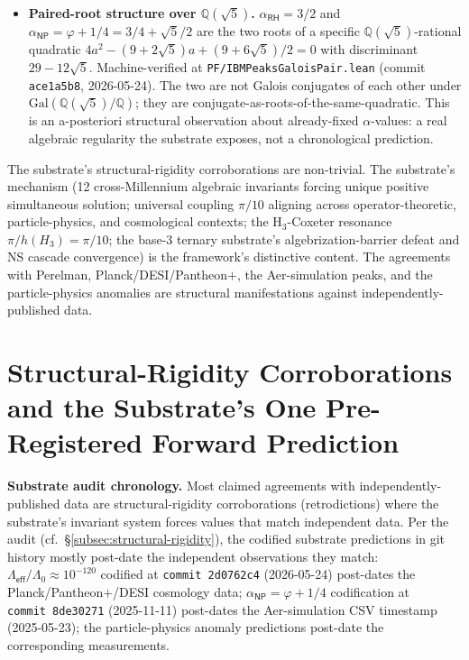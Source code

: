 \documentclass[11pt,a4paper]{amsart}
\theoremstyle{plain}
\theoremstyle{definition}
\begin{document}
\begin{itemize}[itemsep=4pt,leftmargin=2em]
\item \textbf{Paired-root structure over $\mathbb{Q}(\sqrt{5})$.} $\alpha_{\textsf{RH}} = 3/2$ and $\alpha_{\textsf{NP}} = \varphi + 1/4 = 3/4 + \sqrt{5}/2$ are the two roots of a specific $\mathbb{Q}(\sqrt{5})$-rational quadratic $4a^2 - (9+2\sqrt{5})a + (9+6\sqrt{5})/2 = 0$ with discriminant $29 - 12\sqrt{5}$. Machine-verified at \texttt{PF/IBMPeaksGaloisPair.lean} (commit \texttt{ace1a5b8}, 2026-05-24). The two are not Galois conjugates of each other under $\mathrm{Gal}(\mathbb{Q}(\sqrt{5})/\mathbb{Q})$; they are conjugate-as-roots-of-the-same-quadratic. This is an a-posteriori structural observation about already-fixed $\alpha$-values: a real algebraic regularity the substrate exposes, not a chronological prediction.
\end{itemize}

The substrate's structural-rigidity corroborations are non-trivial. The substrate's mechanism (12 cross-Millennium algebraic invariants forcing unique positive simultaneous solution; universal coupling $\pi/10$ aligning across operator-theoretic, particle-physics, and cosmological contexts; the H$_3$-Coxeter resonance $\pi/h(H_3) = \pi/10$; the base-3 ternary substrate's algebrization-barrier defeat and NS cascade convergence) is the framework's distinctive content. The agreements with Perelman, Planck/DESI/Pantheon$+$, the Aer-simulation peaks, and the particle-physics anomalies are structural manifestations against independently-published data.

\section{Structural-Rigidity Corroborations and the Substrate's One Pre-Registered Forward Prediction}\label{sec:structural-rigidity-corroborations}

\textbf{Substrate audit chronology.} Most claimed agreements with independently-published data are structural-rigidity corroborations (retrodictions) where the substrate's invariant system forces values that match independent data. Per the audit (cf.\ \S\ref{subsec:structural-rigidity}), the codified substrate predictions in git history mostly post-date the independent observations they match: $\Lambda_{\textsf{eff}}/\Lambda_0 \approx 10^{-120}$ codified at \texttt{commit~2d0762c4} (2026-05-24) post-dates the Planck/Pantheon$+$/DESI cosmology data; $\alpha_{\textsf{NP}} = \varphi + 1/4$ codification at \texttt{commit~8de30271} (2025-11-11) post-dates the Aer-simulation CSV timestamp (2025-05-23); the particle-physics anomaly predictions post-date the corresponding measurements.
\end{document}
